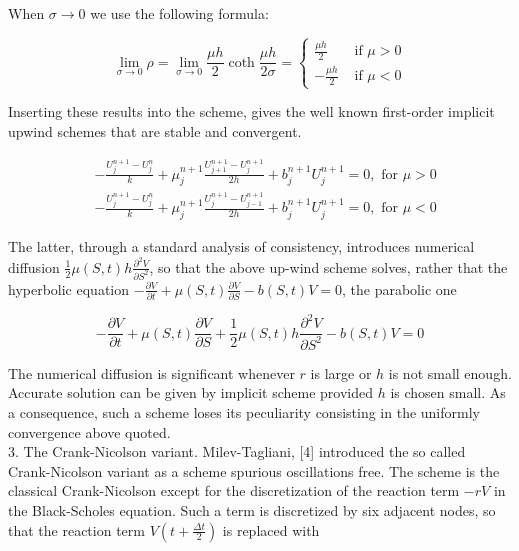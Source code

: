 \documentclass[10pt]{article}
\begin{document}
When $\sigma \rightarrow 0$ we use the following formula:

$$
\lim _{\sigma \rightarrow 0} \rho=\lim _{\sigma \rightarrow 0} \frac{\mu h}{2} \operatorname{coth} \frac{\mu h}{2 \sigma}=\left\{\begin{aligned}
\frac{\mu h}{2} & \text { if } \mu>0 \\
-\frac{\mu h}{2} & \text { if } \mu<0
\end{aligned}\right.
$$

Inserting these results into the scheme, gives the well known first-order implicit upwind schemes that are stable and convergent.

$$
\begin{aligned}
& -\frac{U_{j}^{n+1}-U_{j}^{n}}{k}+\mu_{j}^{n+1} \frac{U_{j+1}^{n+1}-U_{j}^{n+1}}{2 h}+b_{j}^{n+1} U_{j}^{n+1}=0, \text { for } \mu>0 \\
& -\frac{U_{j}^{n+1}-U_{j}^{n}}{k}+\mu_{j}^{n+1} \frac{U_{j}^{n+1}-U_{j-1}^{n+1}}{2 h}+b_{j}^{n+1} U_{j}^{n+1}=0, \text { for } \mu<0
\end{aligned}
$$

The latter, through a standard analysis of consistency, introduces numerical diffusion $\frac{1}{2} \mu(S, t) h \frac{\partial^{2} V}{\partial S^{2}}$, so that the above up-wind scheme solves, rather that the hyperbolic equation $-\frac{\partial V}{\partial t}+\mu(S, t) \frac{\partial V}{\partial S}-b(S, t) V=0$, the parabolic one


\begin{equation*}
-\frac{\partial V}{\partial t}+\mu(S, t) \frac{\partial V}{\partial S}+\frac{1}{2} \mu(S, t) h \frac{\partial^{2} V}{\partial S^{2}}-b(S, t) V=0 \tag{7}
\end{equation*}


The numerical diffusion is significant whenever $r$ is large or $h$ is not small enough. Accurate solution can be given by implicit scheme provided $h$ is chosen small. As a consequence, such a scheme loses its peculiarity consisting in the uniformly convergence above quoted.\\[0pt]
3. The Crank-Nicolson variant. Milev-Tagliani, [4] introduced the so called Crank-Nicolson variant as a scheme spurious oscillations free. The scheme is the classical Crank-Nicolson except for the discretization of the reaction term $-r V$ in the Black-Scholes equation. Such a term is discretized by six adjacent nodes, so that the reaction term $V\left(t+\frac{\Delta t}{2}\right)$ is replaced with
\end{document}
